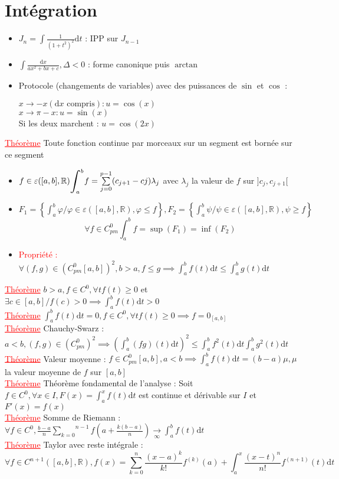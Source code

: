 \documentclass[a4paper, 11pts, french]{article}
\newcommand{\R}{\mathbb{R}}
\newcommand{\dx}{\mathrm{d}x}
\newcommand{\dt}{\mathrm{d}t}
\newcommand{\De}{\Delta}
\newcommand{\la}{\lambda}
\newcommand{\ep}{\varepsilon}
\newcommand{\som}[2]{\overset{#2}{\underset{#1}{\sum}}}
\newcommand{\thm}{\textcolor{red}{\underline{Théorème} }}
\newcommand{\ppt}{\textcolor{red}{Propriété : }}
\newcommand{\limit}[1]{\underset{#1}{\rightarrow}}
\newcommand{\inv}[1]{\frac{1}{#1}}
\newcommand{\acc}[1]{\left\{ #1 \right\}}
\newcommand{\sint}[2]{\vcenter{\hbox{\scaleto[4ex]{\displaystyle\int_{\scriptscriptstyle #1}^{\scriptscriptstyle #2}}{7ex}}}}
\begin{document}
	\section{Intégration}
	\begin{itemize}
	  \item $J_n=\int{\inv{(1+t^2)^2}\dt}$ : IPP sur $J_{n-1}$
	  \item $\int{\frac{\dx}{ax^2+bx+c}}, \De<0$ : forme canonique puis $\arctan$
	  \item Protocole (changements de variables) avec des puissances de $\sin$ et $\cos$ :
		\begin{center}
			$x\rightarrow-x (\dx\text{ compris}) : u=\cos(x)$\\
			$x\rightarrow \pi-x : u=\sin(x)$\\
			Si les deux marchent : $u=\cos(2x)$
		\end{center}
	\end{itemize}
	 \thm Toute fonction continue par morceaux sur un segment est bornée sur ce segment
	\begin{itemize}
	  \item $f\in \ep([a,b],\R) \sint{a}{b} f=\som{j=0}{p-1}(c_{j+1}-c{j})\la_j$ avec $\la_j$ la valeur de $f$ sur $]c_j,c_{j+1}[$
	  \item $F_1=\acc{\int_a^b \varphi / \varphi \in \ep([a,b],\R), \varphi \leqslant f}, F_2=\left\{ \int_a^b \psi / \psi \in \ep([a,b],\R), \psi \geqslant f \right\}$
			$$\forall f \in C_{pm}^0 \int_a^b f=\sup(F_1)=\inf(F_2)$$
	  \item \ppt $\forall (f,g) \in (C_{pm}^0[a,b])^2, b>a, f\leqslant g \implies \int_a^b f(t)\dt\leqslant \int_a^b g(t)\dt$
	\end{itemize}
	 \thm $b>a, f \in C^0, \forall t f(t)\geqslant 0$ et $\exists c \in [a,b] /f(c)>0 \implies \int_a^b f(t) \dt >0$ \\
	 \thm $\int_a^b f(t) \dt=0, f \in C^0, \forall t f(t)\geqslant 0 \implies f=0_{[a,b]}$ \\
	 \thm Chauchy-Swarz : $a<b, (f,g)\in (C_{pm}^0)^2 \implies (\int_a^b (fg)(t)\dt)^2 \leqslant \int_a^b f^2(t)\dt \int_a^b g^2(t) \dt$ \\
	 \thm Valeur moyenne : $f \in C_{pm}^0[a,b], a<b \implies \int_a^b f(t)\dt=(b-a)\mu, \mu$ la valeur moyenne de $f$ sur $[a,b]$ \\
	 \thm Théorème fondamental de l'analyse : Soit $f \in C^0, \forall x \in I, F(x)=\int_a^xf(t)\dt$ est continue et dérivable sur $I$ et $F'(x)=f(x)$ \\
	 \thm Somme de Riemann : $\forall f \in C^0, \frac{b-a}{n}\som{k=0}{n-1}f(a+\frac{k(b-a)}{n}) \limit{\infty}\int_a^b f(t)\dt$ \\
	 \thm Taylor avec reste intégrale : $$\forall f \in C^{n+1}([a,b],\R), f(x)=\som{k=0}{n} \frac{(x-a)^k}{k!}f^{(k)}(a)+\int_a^x\frac{(x-t)^n}{n!}f^{(n+1)}(t)\dt$$
\end{document}
